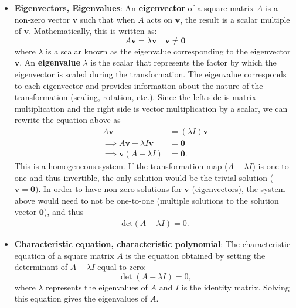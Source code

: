\documentclass{report}
\begin{document}
    \pagebreak 
    \begin{itemize}
         \item \textbf{Eigenvectors, Eigenvalues}:
            An \textbf{eigenvector} of a square matrix \( A \) is a non-zero vector \( \mathbf{v} \) such that when \( A \) acts on \( \mathbf{v} \), the result is a scalar multiple of \( \mathbf{v} \). Mathematically, this is written as:
            \[
                A \mathbf{v} = \lambda \mathbf{v} \quad \mathbf{v} \ne \mathbf{0}
            \]
            where \( \lambda \) is a scalar known as the eigenvalue corresponding to the eigenvector \( \mathbf{v} \).
            \bigbreak \noindent 
            An \textbf{eigenvalue} \( \lambda \) is the scalar that represents the factor by which the eigenvector is scaled during the transformation. The eigenvalue corresponds to each eigenvector and provides information about the nature of the transformation (scaling, rotation, etc.).
            \bigbreak \noindent 
            Since the left side is matrix multiplication and the right side is vector multiplication by a scalar, we can rewrite the equation above as
            \begin{align*}
                A\mathbf{v} &= (\lambda I)\mathbf{v} \\
                \implies A\mathbf{v} - \lambda I \mathbf{v} &= \mathbf{0} \\
                \implies \mathbf{v}(A-\lambda I) &= \mathbf{0}
            .\end{align*}
            \bigbreak \noindent 
            This is a homogeneous system. If the transformation map ($A-\lambda I$) is one-to-one and thus invertible, the only solution would be the trivial solution ($\mathbf{v}  = \mathbf{0})$. In order to have non-zero solutions for $\mathbf{v}$ (eigenvectors), the system above would need to not be one-to-one (multiple solutions to the solution vector $\mathbf{0}$), and thus
            \begin{align*}
                \text{det}(A - \lambda I) = 0
            .\end{align*}
        \item \textbf{Characteristic equation, characteristic polynomial}:
        The characteristic equation of a square matrix \( A \) is the equation obtained by setting the determinant of \( A - \lambda I \) equal to zero:
            \[
                \det(A - \lambda I) = 0,
            \]
            where \( \lambda \) represents the eigenvalues of \( A \) and \( I \) is the identity matrix. Solving this equation gives the eigenvalues of \( A \).

\end{itemize}
\end{document}
